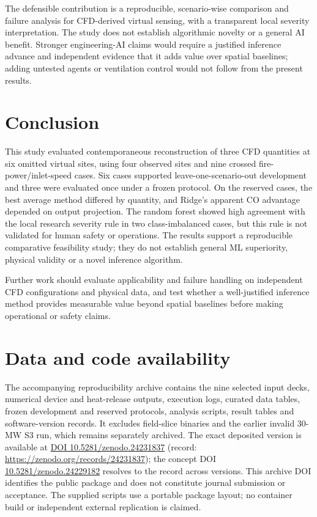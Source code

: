 \documentclass[preprint,12pt,authoryear]{elsarticle}
\begin{document}
The defensible contribution is a reproducible, scenario-wise comparison
and failure analysis for CFD-derived virtual sensing, with a transparent
local severity interpretation. The study does not establish algorithmic
novelty or a general AI benefit. Stronger engineering-AI claims would
require a justified inference advance and independent evidence that it
adds value over spatial baselines; adding untested agents or ventilation
control would not follow from the present results.

\section{Conclusion}
This study evaluated contemporaneous reconstruction of three CFD
quantities at six omitted virtual sites, using four observed sites and
nine crossed fire-power/inlet-speed cases. Six cases supported
leave-one-scenario-out development and three were evaluated once under a
frozen protocol. On the reserved cases, the best average method differed
by quantity, and Ridge's apparent CO advantage depended on output
projection. The random forest showed high agreement with the local
research severity rule in two class-imbalanced cases, but this rule is
not validated for human safety or operations. The results support a
reproducible comparative feasibility study; they do not establish general
ML superiority, physical validity or a novel inference algorithm.

Further work should evaluate applicability and failure handling on
independent CFD configurations and physical data, and test whether a
well-justified inference method provides measurable value beyond spatial
baselines before making operational or safety claims.

\section*{Data and code availability}
The accompanying reproducibility archive contains the nine selected input
decks, numerical device and heat-release outputs, execution logs, curated
data tables, frozen development and reserved protocols, analysis scripts,
result tables and software-version records. It excludes field-slice
binaries and the earlier invalid 30-MW S3 run, which remains separately
archived. The exact deposited version is available at
\href{https://doi.org/10.5281/zenodo.24231837}{DOI 10.5281/zenodo.24231837}
(record: \url{https://zenodo.org/records/24231837}); the concept DOI
\href{https://doi.org/10.5281/zenodo.24229182}{10.5281/zenodo.24229182}
resolves to the record across versions. This archive DOI identifies the
public package and does not constitute journal submission or acceptance.
The supplied scripts use a portable package layout; no container build or
independent external replication is claimed.
\end{document}
